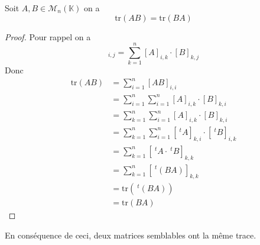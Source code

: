 \documentclass[11pt,colorlinks]{book}
\theoremstyle{mytheoremstyle}
\theoremstyle{mytheoremstyle}
\theoremstyle{mytheoremstyle}
\theoremstyle{mytheoremstyle}
\theoremstyle{mytheoremstyle}
\theoremstyle{mytheoremstyle}
\theoremstyle{mytheoremstyle}
\theoremstyle{mytheoremstyle}
\theoremstyle{myproblemstyle}
\def\mbb#1{\mathbb{#1}}
\def\bK{\mbb{K}}
\begin{document}
\begin{theorem}
  Soit $A,B \in \mathcal{M}_n(\bK)$ on a 
  \begin{equation*}
    \text{tr}(AB) = \text{tr}(BA)
  \end{equation*}
  \begin{proof}
    Pour rappel on a 
    \begin{equation*}
      [AB]_{i,j} = \sum_{k=1}^n [A]_{i,k} \cdot [B]_{k,j}
    \end{equation*}
    Donc 
    \begin{align*}
      \text{tr}(AB) &= \sum_{i=1}^n [AB]_{i,i} \\ 
      &= \sum_{i=1}^n \sum_{i=1}^n [A]_{i,k} \cdot [B]_{k,i} \\ 
      &= \sum_{k=1}^n \sum_{i=1}^n [A]_{i,k} \cdot [B]_{k,i} \\ 
      &= \sum_{k=1}^n \sum_{i=1}^n [~^{t}A]_{k,i} \cdot [~^{t}B]_{i,k} \\ 
      &= \sum_{k=1}^n [~^{t}A \cdot ~^{t}B]_{k,k} \\ 
      &= \sum_{k=1}^n [~^{t}(BA)]_{k,k} \\ 
      &= \text{tr}(~^{t}(BA)) \\
      &= \text{tr}(BA)
    \end{align*}
  \end{proof}
\end{theorem}
\begin{rmq}
  En conséquence de ceci, deux matrices semblables ont la même trace.
\end{rmq}
\end{document}
